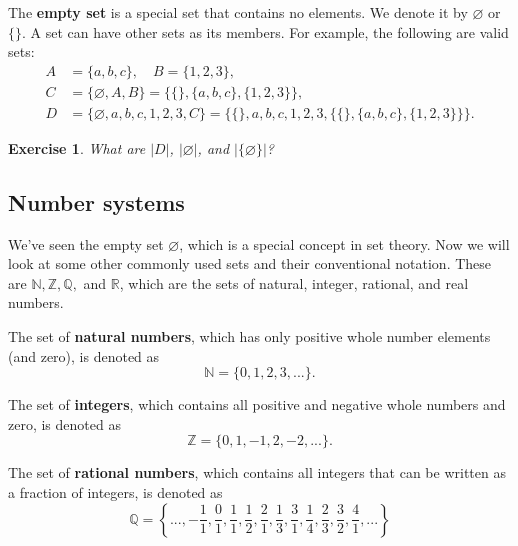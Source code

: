 \documentclass{article}[12pt]
\newtheorem{exercise}{Exercise}
\newcommand{\N}{\mathbb{N}}
\newcommand{\Z}{\mathbb{Z}}
\newcommand{\Q}{\mathbb{Q}}
\newcommand{\R}{\mathbb{R}}
\begin{document}
            The \textbf{empty set} is a special set that contains no elements. We denote it by $\varnothing$ or $\{\}$. A set can have other sets as its members. For example, the following are valid sets:
            \begin{align}
                A &= \{a, b, c\}, \quad B = \{1, 2, 3\},
                \\
                C &= \{\varnothing, A, B\} = \{\{\}, \{a, b, c\}, \{1, 2, 3\}\},
                \\
                D &= \{\varnothing, a, b, c, 1, 2, 3, C\}
                = \{\{\}, a, b, c, 1, 2, 3, \{\{\}, \{a, b, c\}, \{1, 2, 3\}\}\}.
            \end{align}
            
            \begin{exercise}
                What are $|D|$, $|\varnothing|$, and $|\{\varnothing\}|$?
            \end{exercise}
        
        \subsection{Number systems}
            
            We've seen the empty set $\varnothing$, which is a special concept in set theory. Now we will look at some other commonly used sets and their conventional notation. These are $\N, \Z, \Q,$ and $\R$, which are the sets of natural, integer, rational, and real numbers.
            
            The set of \textbf{natural numbers}, which has only positive whole number elements (and zero), is denoted as
            \begin{equation}
                \N = \{0, 1, 2, 3, ...\}.
            \end{equation}
        
            The set of \textbf{integers}, which contains all positive and negative whole numbers and zero, is denoted as
            \begin{equation}
                \Z = \{0, 1, -1, 2, -2, ...\}.
            \end{equation}
            
            The set of \textbf{rational numbers}, which contains all integers that can be written as a fraction of integers, is denoted as
            \begin{equation}
                \Q
                = \left\{..., -\frac{1}{1} , \frac{0}{1}, \frac{1}{1}, \frac{1}{2}, \frac{2}{1}, \frac{1}{3}, \frac{3}{1}, \frac{1}{4}, \frac{2}{3}, \frac{3}{2}, \frac{4}{1}, ...\right\}
            \end{equation}
            
\end{document}

